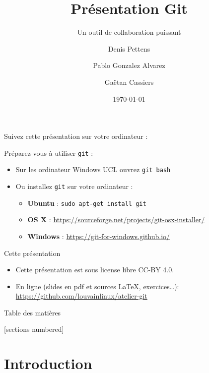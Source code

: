 \documentclass{beamer}
\title{Présentation Git}
\subtitle{Un outil de collaboration puissant}
\date{\today}
\author{Denis Pettens \and Pablo Gonzalez Alvarez \and Gaëtan Cassiers}
\institute{Louvain-li-Nux}
\begin{document}
\begin{frame}
\begin{center}
  Suivez cette présentation sur votre ordinateur :

\end{center}

Préparez-vous à utiliser \texttt{git} :
\begin{itemize}
    \item Sur les ordinateur Windows UCL ouvrez \texttt{git bash}
    \item Ou installez \texttt{git} sur votre ordinateur :
    \begin{itemize}
        \item \textbf{Ubuntu} : \lstinline{sudo apt-get install git}
        \item \textbf{OS X} : \url{https://sourceforge.net/projects/git-osx-installer/}
        \item \textbf{Windows} : \url{https://git-for-windows.github.io/}
    \end{itemize}
\end{itemize}
\end{frame}

\maketitle

\begin{frame}{Cette présentation}
    \begin{itemize}
        \item Cette présentation est sous license libre CC-BY 4.0.
        \item En ligne (slides en pdf et sources \LaTeX, exercices\ldots):
            \url{https://github.com/louvainlinux/atelier-git}
    \end{itemize}
\end{frame}

\begin{frame}{Table des matières}

[sections numbered]
\tableofcontents[hideallsubsections]

\end{frame}

\section{Introduction}
\end{document}
